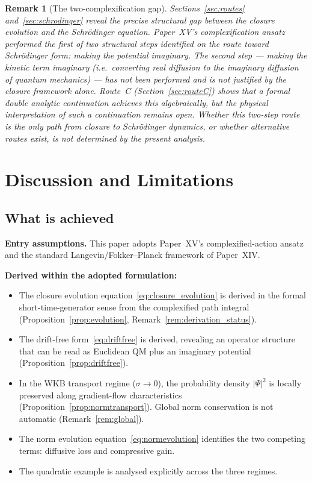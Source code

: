\documentclass[12pt]{article}
\newtheorem{remark}[theorem]{Remark}
\begin{document}
\begin{remark}[The two-complexification gap]
Sections~\ref{sec:routes} and~\ref{sec:schrodinger} reveal the precise structural gap between the closure evolution and the Schr\"odinger equation. Paper~XV's complexification ansatz performed the first of two structural steps identified on the route toward Schr\"odinger form: making the \textit{potential} imaginary. The second step --- making the \textit{kinetic term} imaginary (i.e.\ converting real diffusion to the imaginary diffusion of quantum mechanics) --- has not been performed and is not justified by the closure framework alone. Route~C (Section~\ref{sec:routeC}) shows that a formal double analytic continuation achieves this algebraically, but the physical interpretation of such a continuation remains open. Whether this two-step route is the only path from closure to Schr\"odinger dynamics, or whether alternative routes exist, is not determined by the present analysis.
\end{remark}

\section{Discussion and Limitations}\label{sec:discussion}

\subsection{What is achieved}

\textbf{Entry assumptions.} This paper adopts Paper~XV's complexified-action ansatz and the standard Langevin/Fokker--Planck framework of Paper~XIV.

\textbf{Derived within the adopted formulation:}
\begin{itemize}
    \item The closure evolution equation~\eqref{eq:closure_evolution} is derived in the formal short-time-generator sense from the complexified path integral (Proposition~\ref{prop:evolution}, Remark~\ref{rem:derivation_status}).
    \item The drift-free form~\eqref{eq:driftfree} is derived, revealing an operator structure that can be read as Euclidean QM plus an imaginary potential (Proposition~\ref{prop:driftfree}).
    \item In the WKB transport regime ($\sigma \to 0$), the probability density $|\Psi|^2$ is locally preserved along gradient-flow characteristics (Proposition~\ref{prop:normtransport}). Global norm conservation is not automatic (Remark~\ref{rem:global}).
    \item The norm evolution equation~\eqref{eq:normevolution} identifies the two competing terms: diffusive loss and compressive gain.
    \item The quadratic example is analysed explicitly across the three regimes.
\end{itemize}
\end{document}
